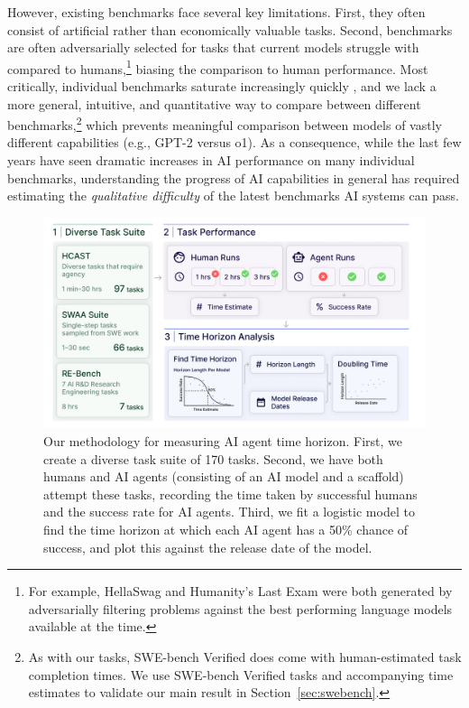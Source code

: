 \documentclass{article}
\newcommand{\numtasks}{170}
\begin{document}
However, existing benchmarks face several key limitations. 
First, they often consist of artificial rather than economically valuable tasks. 
Second, benchmarks are often adversarially selected for tasks that current models struggle with compared to humans,\footnote{For example, HellaSwag \citep{zellers2019hellaswag} and Humanity's Last Exam \citep{phan2025humanity} were both generated by adversarially filtering problems against the best performing language models available at the time.} biasing the comparison to human performance. 
Most critically, individual benchmarks saturate increasingly quickly \citep{maslej2024aiindexreport}, and we lack a more general, intuitive, and quantitative way to compare between different benchmarks,\footnote{As with our tasks, SWE-bench Verified \cite{chowdhury2024SWEbench} does come with human-estimated task completion times. We use SWE-bench Verified tasks and accompanying time estimates to validate our main result in Section~\ref{sec:swebench}.} which prevents meaningful comparison between models of vastly different capabilities (e.g., GPT-2 versus o1). 
As a consequence, while the last few years have seen dramatic increases in AI performance on many individual benchmarks, understanding the progress of AI capabilities in general has required estimating the \emph{qualitative difficulty} of the latest benchmarks AI systems can pass. 

\begin{figure}
    \centering
    \includegraphics[width=0.9\linewidth]{images/methodology_new.png}
    \caption{Our methodology for measuring AI agent time horizon. First, we create a diverse task suite of \numtasks{} tasks. Second, we have both humans and AI agents (consisting of an AI model and a scaffold) attempt these tasks, recording the time taken by successful humans and the success rate for AI agents. Third, we fit a logistic model to find the time horizon at which each AI agent has a 50\% chance of success, and plot this against the release date of the model.}
    \label{fig:methodology}
\end{figure}
\end{document}
